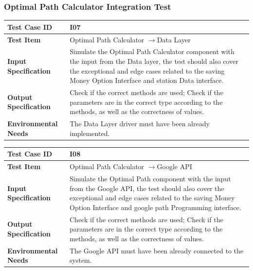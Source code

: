 \documentclass[a4paper,11pt]{article}
\begin{document}
		\subsubsection{Optimal Path Calculator Integration Test}
		\begin{table}[H] 
\begin{center}
\renewcommand\arraystretch{1.5}
\begin{tabular}{|p{5cm}|p{7cm}|}
 \hline
\textbf{Test Case ID}& I07\\
 \hline
\textbf{Test Item}&Optimal Path Calculator $\rightarrow$Data Layer\\
 \hline
\textbf{Input Specification}&Simulate the Optimal Path Calculator component with the input from the Data layer, the test should also cover the exceptional and edge cases related to the saving Money Option Interface and station Data interface.\\
 \hline
\textbf{Output Specification}&Check if the correct methods are used;
Check if the parameters are in the correct type according to the methods, as well as the correctness of values.\\
 \hline
 \textbf{Environmental Needs}&The Data Layer driver must have been already implemented.\\
 \hline
\end{tabular}
\end{center}
\end{table}		
\begin{table}[H] 
\begin{center}
\renewcommand\arraystretch{1.5}
\begin{tabular}{|p{5cm}|p{7cm}|}
 \hline
\textbf{Test Case ID}& I08\\
 \hline
\textbf{Test Item}&Optimal Path Calculator $\rightarrow$Google API\\
 \hline
\textbf{Input Specification}&Simulate the Optimal Path component with the input from the Google API, the test should also cover the exceptional and edge cases related to the saving Money Option Interface and google path Programming interface.\\
 \hline
\textbf{Output Specification}&Check if the correct methods are used;
Check if the parameters are in the correct type according to the methods, as well as the correctness of values.\\
 \hline
 \textbf{Environmental Needs}&The Google API must have been already connected to the system.\\
 \hline
\end{tabular}
\end{center}
\end{table}		
\end{document}
